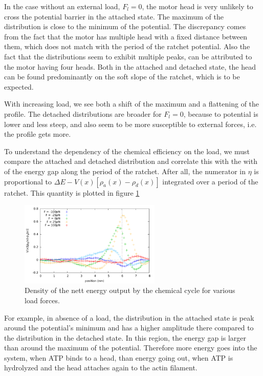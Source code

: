 \documentclass[aps,pre,onecolumn,showpacs,showkeys,a4paper]{revtex4}
\begin{document}
In the case without an external load, $F_l=0$, the motor head is very unlikely to cross the potential barrier in the attached state. 
The maximum of the distribution is close to the minimum of the potential. 
The discrepancy comes from the fact that the motor has multiple head with a fixed distance between them, which does not match with the period of the ratchet potential. 
Also the fact that the distributions seem to exhibit multiple peaks, can be attributed to the motor having four heads. 
Both in the attached and detached state, the head can be found predominantly on the soft slope of the ratchet, which is to be expected.


With increasing load, we see both a shift of the maximum and a flattening of the profile. 
The detached distributions are broader for $F_l=0$, because to potential is lower and less steep, and also seem to be more susceptible to external forces, i.e. the profile gets more. 


To understand the dependency of the chemical efficiency on the load, we must compare the attached and detached distribution and correlate this with the with of the energy gap along the period of the ratchet. 
After all, the numerator in $\eta$ is proportional to $\Delta E - V(x)\left[\rho_a(x) - \rho_d(x)\right]$ integrated over a period of the ratchet. 
This quantity is plotted in figure \ref{Fig: chem_energy_distr}
\begin{figure}[h]
\centering
\includegraphics[width=0.6\textwidth,height=!]{chem_energy_distr_all_F}
\caption{Density of the nett energy output by the chemical cycle for various load forces.}
\label{Fig: chem_energy_distr}
\end{figure}


For example, in absence of a load, the distribution in the attached state is peak around the potential's minimum and has a higher amplitude there compared to the distribution in the detached state. 
In this region, the energy gap is larger than around the maximum of the potential. 
Therefore more energy goes into the system, when ATP binds to a head, than energy going out, when ATP is hydrolyzed and the head attaches again to the actin filament. 
\end{document}
